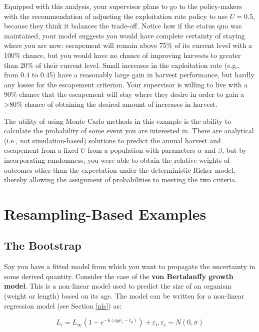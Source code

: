 \documentclass[]{book}
\theoremstyle{definition}
\theoremstyle{definition}
\theoremstyle{definition}
\theoremstyle{remark}
\begin{document}
Equipped with this analysis, your supervisor plans to go to the
policy-makers with the recommendation of adjusting the exploitation rate
policy to use \(U = 0.5\), because they think it balances the trade-off.
Notice how if the status quo was maintained, your model suggests you
would have complete certainty of staying where you are now: escapement
will remain above 75\% of its current level with a 100\% chance, but you
would have no chance of improving harvests to greater than 20\% of their
current level. Small increases in the exploitation rate (e.g., from 0.4
to 0.45) have a reasonably large gain in harvest performance, but hardly
any losses for the escapement criterion. Your supervisor is willing to
live with a 90\% chance that the escapement will stay where they desire
in order to gain a \textgreater{}80\% chance of obtaining the desired
amount of increases in harvest.

The utility of using Monte Carlo methods in this example is the ability
to calculate the probability of some event you are interested in. There
are analytical (i.e., not simulation-based) solutions to predict the
annual harvest and escapement from a fixed \(U\) from a population with
parameters \(\alpha\) and \(\beta\), but by incorporating randomness,
you were able to obtain the relative weights of outcomes other than the
expectation under the deterministic Ricker model, thereby allowing the
assignment of probabilities to meeting the two criteria.

\section{Resampling-Based Examples}\label{resample-examples}

\subsection{The Bootstrap}\label{boot-test-ex}

Say you have a fitted model from which you want to propagate the
uncertainty in some derived quantity. Consider the case of the
\textbf{von Bertalanffy growth model}. This is a non-linear model used
to predict the size of an organism (weight or length) based on its age.
The model can be written for a non-linear regression model (see Section
\ref{nls}) as:

\begin{equation}
  L_i = L_{\infty}\left(1 - e^{-k(age_i-t_0)}\right) + \varepsilon_i, \varepsilon_i \sim N(0, \sigma)
\label{eq:vonB}
\end{equation}
\end{document}
